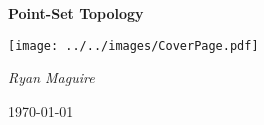 \documentclass{book}
\theoremstyle{plain}
\theoremstyle{normal}
\numberwithin{equation}{section}
\begin{document}
    \pagecolor{CoverPage}
    \begin{titlepage}
        \centering
        \LARGE{\bfseries{Point-Set Topology}}
        \par\vspace{3.5cm}
        \texttt{[image: ../../images/CoverPage.pdf]}
        \par\vspace{4cm}
        \Large{\itshape{Ryan Maguire}}
        \par\vspace{1.5ex}
        \normalsize{\today}
    \end{titlepage}
    \nopagecolor
    \tableofcontents
    \listoffigures
    \clearpage
    
    
    \newpage
    
    
    \newpage

    \printnoidxglossary[type=notation, style=mcolindex, sort=def]
    \clearpage
    \printnoidxglossary[style=longpara]

    \clearpage
    \printindex
\end{document}
